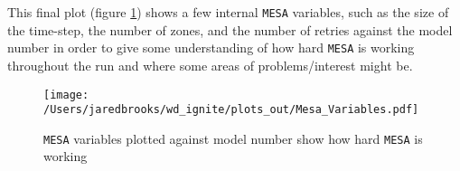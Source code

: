 \documentclass{article}
\begin{document}
        \pagebreak

        This final plot (figure \ref{fig:6}) shows a few internal \texttt{MESA} variables, such as the size of the time-step, the number of zones, and the number of retries against the model number in order to give some understanding of how hard \texttt{MESA} is working throughout the run and where some areas of problems/interest might be.

        \begin{figure}[H]
          \centering
          \texttt{[image: /Users/jaredbrooks/wd\_ignite/plots\_out/Mesa\_Variables.pdf]}
          \caption{\texttt{MESA} variables plotted against model number show how hard \texttt{MESA} is working}
          \label{fig:6}
        \end{figure}
\end{document}
